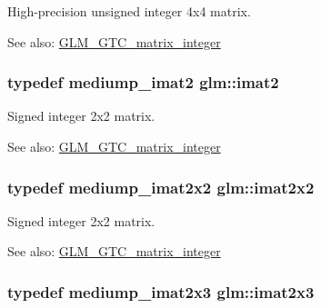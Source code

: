High-precision unsigned integer 4x4 matrix. \begin{Desc}
\item[See also:]\hyperlink{group__gtc__matrix__integer}{GLM\_\-GTC\_\-matrix\_\-integer} \end{Desc}
\hypertarget{group__gtc__matrix__integer_g77a581b3366fb63fc72f8f20830003e0}{
\subsubsection[imat2]{\setlength{\rightskip}{0pt plus 5cm}typedef mediump\_\-imat2 {\bf glm::imat2}}}
\label{group__gtc__matrix__integer_g77a581b3366fb63fc72f8f20830003e0}


Signed integer 2x2 matrix. \begin{Desc}
\item[See also:]\hyperlink{group__gtc__matrix__integer}{GLM\_\-GTC\_\-matrix\_\-integer} \end{Desc}
\hypertarget{group__gtc__matrix__integer_gf7f44f44d966377666d41ed059524732}{
\subsubsection[imat2x2]{\setlength{\rightskip}{0pt plus 5cm}typedef mediump\_\-imat2x2 {\bf glm::imat2x2}}}
\label{group__gtc__matrix__integer_gf7f44f44d966377666d41ed059524732}


Signed integer 2x2 matrix. \begin{Desc}
\item[See also:]\hyperlink{group__gtc__matrix__integer}{GLM\_\-GTC\_\-matrix\_\-integer} \end{Desc}
\hypertarget{group__gtc__matrix__integer_g143bc5177bac9991d84b70da03952516}{
\subsubsection[imat2x3]{\setlength{\rightskip}{0pt plus 5cm}typedef mediump\_\-imat2x3 {\bf glm::imat2x3}}}
\label{group__gtc__matrix__integer_g143bc5177bac9991d84b70da03952516}


